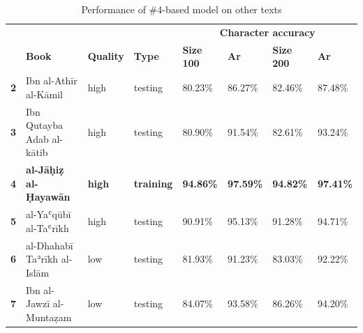 \begin{subappendices}
\begin{table}[H]
\begin{minipage}{\textwidth}
\begin{center}
\caption{Performance of \#4-based model on other texts}
\label{tab:soa_atab3}
\renewcommand*{\thefootnote}{\alph{footnote}}
\begin{tabularx}{\textwidth}{lp{2.2cm}XXXXXX} \toprule
& & & & \multicolumn{4}{c}{\textbf{Character accuracy}}\\
\cline{5-8}
& \textbf{Book}& \textbf{Quality} & \textbf{Type} & \textbf{Size 100} & \textbf{Ar}& \textbf{Size 200} & \textbf{Ar}\\\midrule
\textbf{2} & Ibn al-Athīr \newline\scriptsize{al-Kāmil} &  	  high& testing & 80.23\% & 86.27\% & 82.46\% & 87.48\%\\
\textbf{3} & Ibn Qutayba \newline\scriptsize{Adab al-kātib} & high& testing	& 80.90\% & 91.54\% & 82.61\% & 93.24\% \\
\textbf{4} & \textbf{al-Jāḥiẓ \newline\scriptsize{al-Ḥayawān}} & 	  \textbf{high}& \textbf{training} & \textbf{94.86\%} & \textbf{97.59\%} & \textbf{94.82\%} & \textbf{97.41\%}\\
\textbf{5} & al-Yaʿqūbī \newline\scriptsize{al-Taʿrīkh} & 	  high& testing & 90.91\% & 95.13\% & 91.28\% & 94.71\%\\
\textbf{6} & al-Dhahabī \newline\scriptsize{Taʾrīkh al-Islām}  & low& testing	& 81.93\% & 91.23\% & 83.03\% & 92.22\%\\
\textbf{7} & Ibn al-Jawzī \newline\scriptsize{al-Muntaẓam} &    low& testing & 84.07\% & 93.58\% & 86.26\% & 94.20\%\\
\bottomrule
\end{tabularx}
\end{center}
\end{minipage}
\end{table}


\end{subappendices}
